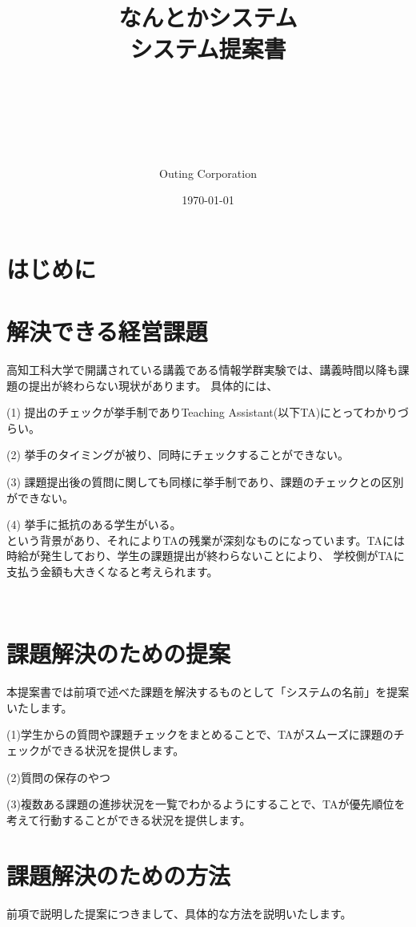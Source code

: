 \documentclass[a4j,titlepage]{ujarticle}
\title{
{なんとかシステム
\\
システム提案書}
\author{\\
\\
\\
\\
\\
Outing Corporation}
\date{\today}
}
\begin{document}
\maketitle


\tableofcontents



\clearpage


\section{はじめに}


\section{解決できる経営課題}
高知工科大学で開講されている講義である情報学群実験では、講義時間以降も課題の提出が終わらない現状があります。
具体的には、

(1) 提出のチェックが挙手制でありTeaching Assistant(以下TA)にとってわかりづらい。

(2) 挙手のタイミングが被り、同時にチェックすることができない。

(3) 課題提出後の質問に関しても同様に挙手制であり、課題のチェックとの区別ができない。

(4) 挙手に抵抗のある学生がいる。\\
という背景があり、それによりTAの残業が深刻なものになっています。TAには時給が発生しており、学生の課題提出が終わらないことにより、
学校側がTAに支払う金額も大きくなると考えられます。






\section{課題解決のための提案}
本提案書では前項で述べた課題を解決するものとして「システムの名前」を提案いたします。

(1)学生からの質問や課題チェックをまとめることで、TAがスムーズに課題のチェックができる状況を提供します。

(2)質問の保存のやつ

(3)複数ある課題の進捗状況を一覧でわかるようにすることで、TAが優先順位を考えて行動することができる状況を提供します。


\section{課題解決のための方法}
前項で説明した提案につきまして、具体的な方法を説明いたします。
\end{document}
